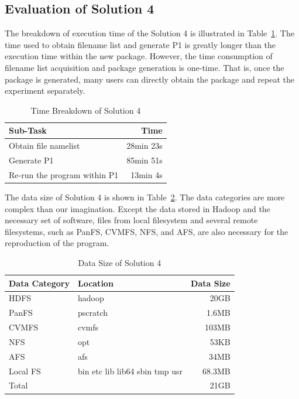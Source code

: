\documentclass{acm_proc_article-sp}
\begin{document}
\subsection{Evaluation of Solution 4} 

The breakdown of execution time of the
Solution 4 is illustrated in Table~\ref{table:time-3rd}. The time used to
obtain filename list and generate P1 is greatly longer than the execution time
within the new package. However, the time consumption of filename list
acquisition and package generation is one-time. That is, once the package is
generated, many users can directly obtain the package and repeat the experiment
separately. 

\begin{table}
    \centering
    \begin{tabular}{|l|r|}
    \hline
    Sub-Task & Time \\ \hline
    Obtain file namelist & 28min 23s \\ \hline
    Generate P1 & 85min 51s \\ \hline
    Re-run the program within P1 & 13min 4s \\ \hline
    \end{tabular}
    \caption{Time Breakdown of Solution 4}
    \label{table:time-3rd}
\end{table}

The data size of Solution 4 is shown in Table~\ref{table:datasize-3rd}. The
data categories are more complex than our imagination. Except the data stored in
Hadoop and the necessary set of software, files from local filesystem and several remote filesystems, such as PanFS, CVMFS, NFS, and AFS, are also necessary for the reproduction of the program.

\begin{table}
    \centering
    \begin{tabular}{|l|l|r|}
    \hline
    Data Category &Location & Data Size \\ \hline
    HDFS & hadoop &20GB \\ \hline
    PanFS & pscratch & 1.6MB \\ \hline
    CVMFS & cvmfs &103MB \\ \hline 
    NFS & opt &53KB \\ \hline
    AFS & afs &34MB \\ \hline
    Local FS& bin etc lib lib64 sbin tmp usr&68.3MB \\ \hline
    Total & &21GB \\ \hline
    \end{tabular}
    \caption{Data Size of Solution 4}
    \label{table:datasize-3rd}
\end{table}    
\end{document}

